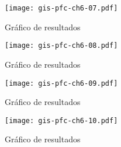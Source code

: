 \documentclass[a4paper,12pt]				{article}
\begin{document}
\begin{figure}
	\begin{center}
		\texttt{[image: gis-pfc-ch6-07.pdf]}
	\end{center}
	\caption{Gráfico de resultados}
	\label{fig:gis-pfc-ch6-07}
\end{figure}

\begin{figure}
	\begin{center}
		\texttt{[image: gis-pfc-ch6-08.pdf]}
	\end{center}
	\caption{Gráfico de resultados}
	\label{fig:gis-pfc-ch6-08}
\end{figure}

\begin{figure}
	\begin{center}
		\texttt{[image: gis-pfc-ch6-09.pdf]}
	\end{center}
	\caption{Gráfico de resultados}
	\label{fig:gis-pfc-ch6-09}
\end{figure}

\begin{figure}
	\begin{center}
		\texttt{[image: gis-pfc-ch6-10.pdf]}
	\end{center}
	\caption{Gráfico de resultados}
	\label{fig:gis-pfc-ch6-10}
\end{figure}
\end{document}
